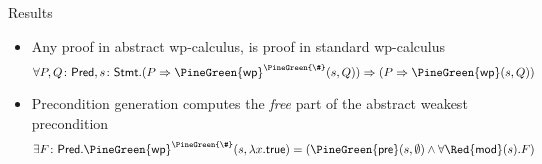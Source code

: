 \documentclass[final,nocolorBG,a4,marieke,nototal,pdf, accumulate,slideColor]{prosper}
\begin{document}
\begin{slide}{Results}
\begin{itemize}
\item Any proof in abstract wp-calculus, is proof in standard
wp-calculus
\[
\forall P, Q\colon\mathsf{Pred}, s\colon\mathsf{Stmt}. 
(P \Rightarrow \mathsf{\PineGreen{wp}}^{\PineGreen{\#}}(s, Q)) \Rightarrow
               (P \Rightarrow \mathsf{\PineGreen{wp}}(s, Q))
\]
\item Precondition generation computes the \emph{free} part of the
abstract weakest precondition
\[
\exists F\colon\mathsf{Pred}.  
             \mathsf{\PineGreen{wp}}^{\PineGreen{\#}}(s, \lambda x. \mathsf{true}) = 
             (\mathsf{\PineGreen{pre}}(s, \emptyset) \wedge \forall
              \mathsf{\Red{mod}}(s). F) 
\]
\end{itemize}
\end{slide}
\end{document}
